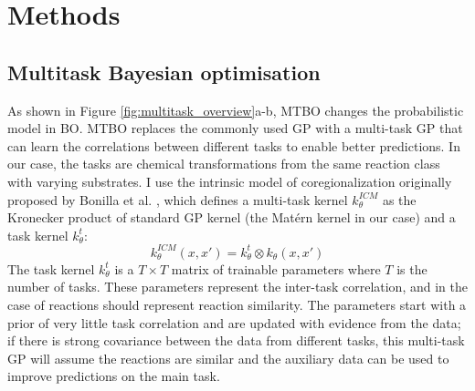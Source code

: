 \section{Methods}

\subsection{Multitask Bayesian optimisation}

As shown in Figure \ref{fig:multitask_overview}a-b, MTBO changes the probabilistic model in BO.  MTBO replaces the commonly used GP with a multi-task GP that can learn the correlations between different tasks to enable better predictions. In our case, the tasks are chemical transformations from the same reaction class with varying substrates. I use the intrinsic model of coregionalization originally proposed by Bonilla et al. \cite{Bonilla2007}, which defines a multi-task kernel $k^{ICM}_{\theta}$ as the Kronecker product of standard GP kernel (the Matérn kernel in our case) and a task kernel $k^t_{\theta}$:
\begin{equation}
    k^{ICM}_{\theta}(x,x') = k^t_{\theta} \otimes  k_{\theta}(x,x')
\end{equation}
The task kernel $k^t_{\theta}$ is a $T \times T$ matrix of trainable parameters where $T$ is the number of tasks. These parameters represent the inter-task correlation, and in the case of reactions should represent reaction similarity. The parameters start with a prior of very little task correlation and are updated with evidence from the data; if there is strong covariance between the data from different tasks, this multi-task GP will assume the reactions are similar and the auxiliary data can be used to improve predictions on the main task.


